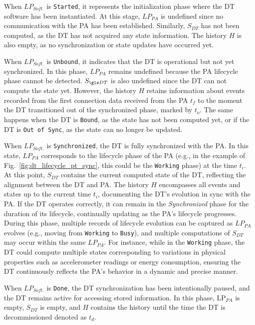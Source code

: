 When $LP_{Soft.}$ is \texttt{Started}, it represents the initialization phase where the \ac{DT} software has been instantiated. At this stage, $LP_{PA}$ is undefined since no communication with the \ac{PA} has been established. 
Similarly, $S_{DT}$ has not been computed, as the \ac{DT} has not acquired any state information. The history $H$ is also empty, as no synchronization or state updates have occurred yet.

When $LP_{Soft.}$ is \texttt{Unbound}, it indicates that the \ac{DT} is operational but not yet synchronized.
In this phase, $LP_{PA}$ remains undefined because the \ac{PA} lifecycle phase cannot be detected.
$S_{\ac{DT}}$ is also undefined since the \ac{DT} can not compute the state yet.
However, the history $H$ retains information about events recorded from the first connection data received from the \ac{PA} $t_{f}$ to the moment the \ac{DT} transitioned out of the synchronized phase, marked by $t_{o}$.
%
The same happens when the \ac{DT} is \texttt{Bound}, as the state has not been computed yet, 
or if the \ac{DT} is \texttt{Out of Sync}, as the state can no longer be updated.

When $LP_{Soft.}$  is \texttt{Synchronized}, the \ac{DT} is fully synchronized with the \ac{PA}.
In this state, $LP_{PA}$ corresponds to the lifecycle phase of the PA (e.g., in the example of Fig.~\ref{fig:dt_lifecycle_pt_sync}, this could be the \texttt{Working} phase) at the time $t_i$.
At this point, $S_{DT}$ contains the current computed state of the \ac{DT}, reflecting the alignment between the \ac{DT} and \ac{PA}.
The history $H$ encompasses all events and states up to the current time $t_{i}$, documenting the \ac{DT}'s evolution in sync with the PA.
If the \ac{DT} operates correctly, it can remain in the \textit{Synchronized} phase for the duration of its lifecycle, continually updating as the PA's lifecycle progresses.
During this phase, multiple records of lifecycle evolution can be captured as $LP_{PA}$ evolves (e.g., moving from \texttt{Working} to \texttt{Busy}), and multiple computations of $S_{DT}$ may occur within the same $LP_{PA}$.
For instance, while in the \texttt{Working} phase, the \ac{DT} could compute multiple states corresponding to variations in physical properties such as accelerometer readings or energy consumption, ensuring the \ac{DT} continuously reflects the PA's behavior in a dynamic and precise manner.

When $LP_{Soft.}$ is \texttt{Done}, the \ac{DT} synchronization has been intentionally paused, and the \ac{DT} remains active for accessing stored information. In this phase, $\text{LP}_{PA}$ is empty, $S_{DT}$ is empty, and $H$ contains the history until the time the \ac{DT} is decommissioned denoted as $t_{d}$.

